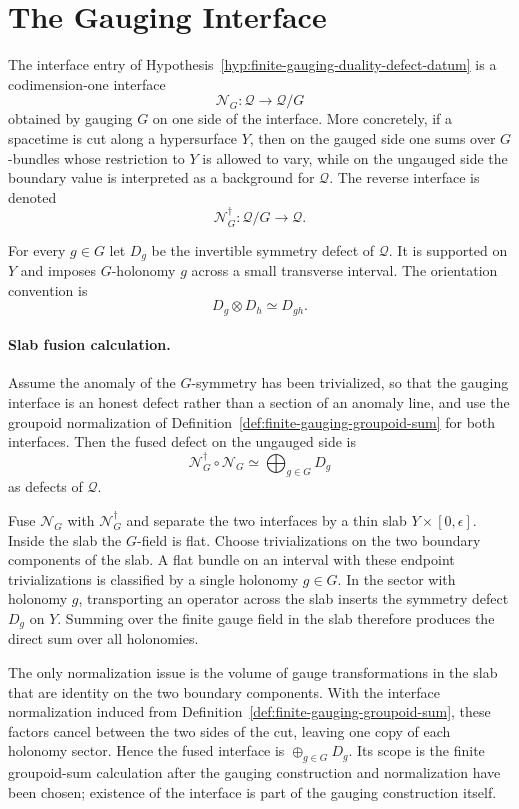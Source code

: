 \section{The Gauging Interface}

The interface entry of
Hypothesis~\ref{hyp:finite-gauging-duality-defect-datum} is a
codimension-one interface
\[
  \mathcal N_G:\mathcal Q\longrightarrow \mathcal Q/G
\]
obtained by gauging \(G\) on one side of the interface.  More concretely, if a
spacetime is cut along a hypersurface \(Y\), then on the gauged side one sums
over \(G\)-bundles whose restriction to \(Y\) is allowed to vary, while on the
ungauged side the boundary value is interpreted as a background for
\(\mathcal Q\).  The reverse interface is denoted
\[
  \mathcal N_G^\dagger:\mathcal Q/G\longrightarrow\mathcal Q .
\]

For every \(g\in G\) let \(D_g\) be the invertible symmetry defect of
\(\mathcal Q\).  It is supported on \(Y\) and imposes \(G\)-holonomy \(g\)
across a small transverse interval.  The orientation convention is
\[
  D_g\otimes D_h\simeq D_{gh}.
\]

\paragraph{Slab fusion calculation.}
Assume the anomaly of the \(G\)-symmetry has been trivialized, so that the
gauging interface is an honest defect rather than a section of an anomaly
line, and use the groupoid normalization of
Definition~\ref{def:finite-gauging-groupoid-sum} for both interfaces.  Then
the fused defect on the ungauged side is
\begin{equation}
  \mathcal N_G^\dagger\circ\mathcal N_G
  \simeq
  \bigoplus_{g\in G}D_g
  \label{eq:gauging-interface-slab-fusion}
\end{equation}
as defects of \(\mathcal Q\).

Fuse \(\mathcal N_G\) with \(\mathcal N_G^\dagger\) and separate the two
interfaces by a thin slab \(Y\times[0,\epsilon]\).  Inside the slab the
\(G\)-field is flat.  Choose trivializations on the two boundary components
of the slab.  A flat bundle on an interval with these endpoint
trivializations is classified by a single holonomy \(g\in G\).  In the
sector with holonomy \(g\), transporting an operator across the slab inserts
the symmetry defect \(D_g\) on \(Y\).  Summing over the finite gauge field in
the slab therefore produces the direct sum over all holonomies.

The only normalization issue is the volume of gauge transformations in the
slab that are identity on the two boundary components.  With the interface
normalization induced from Definition~\ref{def:finite-gauging-groupoid-sum},
these factors cancel between the two sides of the cut, leaving one copy of
each holonomy sector.  Hence the fused interface is
\(\oplus_{g\in G}D_g\).
Its scope is the finite groupoid-sum calculation after the gauging construction and
normalization have been chosen; existence of the interface is part of the
gauging construction itself.

